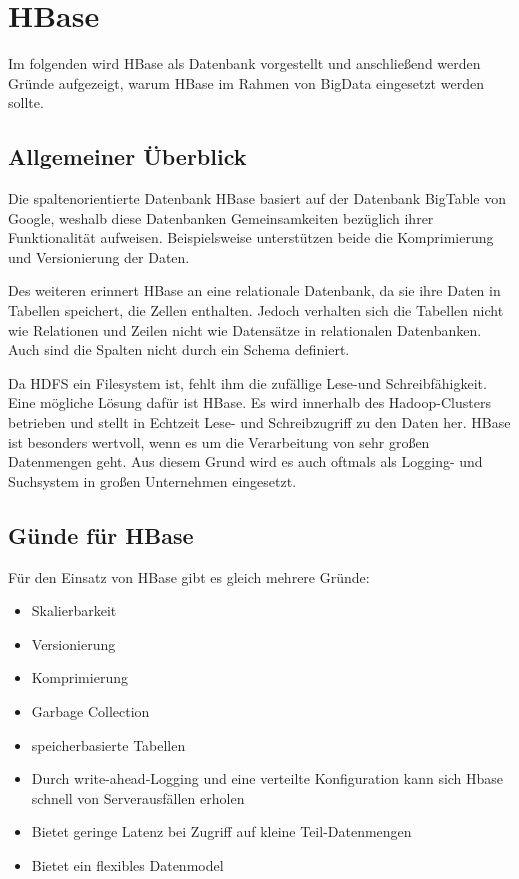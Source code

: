\chapter{HBase}
Im folgenden wird HBase als Datenbank vorgestellt und anschließend werden Gründe aufgezeigt, warum HBase im Rahmen von BigData eingesetzt werden sollte.

\section{Allgemeiner Überblick}
Die spaltenorientierte Datenbank HBase basiert auf der Datenbank BigTable von Google, weshalb diese Datenbanken Gemeinsamkeiten bezüglich ihrer Funktionalität aufweisen. Beispielsweise unterstützen beide die Komprimierung und Versionierung der Daten.

Des weiteren erinnert HBase an eine relationale Datenbank, da sie ihre Daten in Tabellen speichert, die Zellen enthalten. Jedoch verhalten sich die Tabellen nicht wie Relationen und Zeilen nicht wie Datensätze in relationalen Datenbanken. Auch sind die Spalten nicht durch ein Schema definiert.

Da HDFS ein Filesystem ist, fehlt ihm die zufällige Lese-und Schreibfähigkeit. Eine mögliche Lösung dafür ist HBase. Es wird innerhalb des Hadoop-Clusters betrieben und stellt in Echtzeit Lese- und Schreibzugriff zu den Daten her. HBase ist besonders wertvoll, wenn es um die Verarbeitung von sehr großen Datenmengen geht. Aus diesem Grund wird es auch oftmals als Logging- und Suchsystem in großen Unternehmen eingesetzt.

\section{Günde für HBase}
Für den Einsatz von HBase gibt es gleich mehrere Gründe:
\begin{itemize}

\item Skalierbarkeit
\item Versionierung
\item Komprimierung
\item Garbage Collection
\item speicherbasierte Tabellen
\item Durch write-ahead-Logging und eine verteilte Konfiguration kann sich Hbase schnell von Serverausfällen erholen
\item Bietet geringe Latenz bei Zugriff auf kleine Teil-Datenmengen 
\item Bietet ein flexibles Datenmodel
\end{itemize}